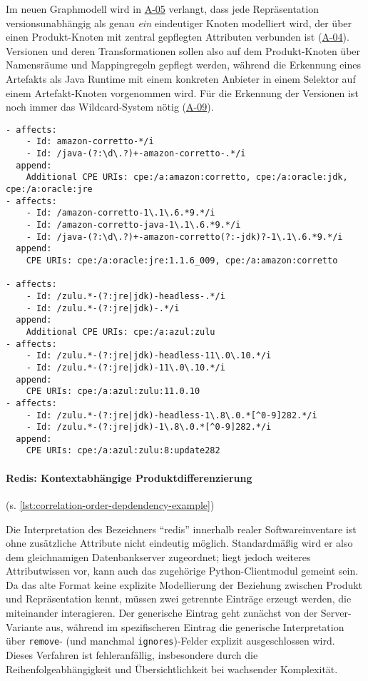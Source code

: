 Im neuen Graphmodell wird in \hyperref[subsec:req-unique-product-representations]{A-05} verlangt, dass jede Repräsentation versionsunabhängig als genau \textit{ein} eindeutiger Knoten modelliert wird, der über einen Produkt-Knoten mit zentral gepflegten Attributen verbunden ist (\hyperref[subsec:req-product-concept]{A-04}).
Versionen und deren Transformationen sollen also auf dem Produkt-Knoten über Namensräume und Mappingregeln gepflegt werden, während die Erkennung eines Artefakts als Java Runtime mit einem konkreten Anbieter in einem Selektor auf einem Artefakt-Knoten vorgenommen wird.
Für die Erkennung der Versionen ist noch immer das Wildcard-System nötig (\hyperref[subsec:req-regex-support]{A-09}).

\begin{lstlisting}[style=yaml,caption={Java-Runtime-Korrelation mit Versionstransformation},label={lst:reference-case-java-runtimes},basicstyle=\ttfamily\scriptsize]
- affects:
    - Id: amazon-corretto-*/i
    - Id: /java-(?:\d\.?)+-amazon-corretto-.*/i
  append:
    Additional CPE URIs: cpe:/a:amazon:corretto, cpe:/a:oracle:jdk, cpe:/a:oracle:jre
- affects:
    - Id: /amazon-corretto-1\.1\.6.*9.*/i
    - Id: /amazon-corretto-java-1\.1\.6.*9.*/i
    - Id: /java-(?:\d\.?)+-amazon-corretto(?:-jdk)?-1\.1\.6.*9.*/i
  append:
    CPE URIs: cpe:/a:oracle:jre:1.1.6_009, cpe:/a:amazon:corretto

- affects:
    - Id: /zulu.*-(?:jre|jdk)-headless-.*/i
    - Id: /zulu.*-(?:jre|jdk)-.*/i
  append:
    Additional CPE URIs: cpe:/a:azul:zulu
- affects:
    - Id: /zulu.*-(?:jre|jdk)-headless-11\.0\.10.*/i
    - Id: /zulu.*-(?:jre|jdk)-11\.0\.10.*/i
  append:
    CPE URIs: cpe:/a:azul:zulu:11.0.10
- affects:
    - Id: /zulu.*-(?:jre|jdk)-headless-1\.8\.0.*[^0-9]282.*/i
    - Id: /zulu.*-(?:jre|jdk)-1\.8\.0.*[^0-9]282.*/i
  append:
    CPE URIs: cpe:/a:azul:zulu:8:update282
\end{lstlisting}

\paragraph{Redis: Kontextabhängige Produktdifferenzierung}\label{par:reference-case-redis} (s. \autoref{lst:correlation-order-depdendency-example})

Die Interpretation des Bezeichners \enquote{redis} innerhalb realer Softwareinventare ist ohne zusätzliche Attribute nicht eindeutig möglich.
Standardmäßig wird er also dem gleichnamigen Datenbankserver zugeordnet; liegt jedoch weiteres Attributwissen vor, kann auch das zugehörige Python-Clientmodul gemeint sein.
Da das alte Format keine explizite Modellierung der Beziehung zwischen Produkt und Repräsentation kennt, müssen zwei getrennte Einträge erzeugt werden, die miteinander interagieren.
Der generische Eintrag geht zunächst von der Server-Variante aus, während im spezifischeren Eintrag die generische Interpretation über \texttt{remove}- (und manchmal \texttt{ignores})-Felder explizit ausgeschlossen wird.
Dieses Verfahren ist fehleranfällig, insbesondere durch die Reihenfolgeabhängigkeit und Übersichtlichkeit bei wachsender Komplexität.

